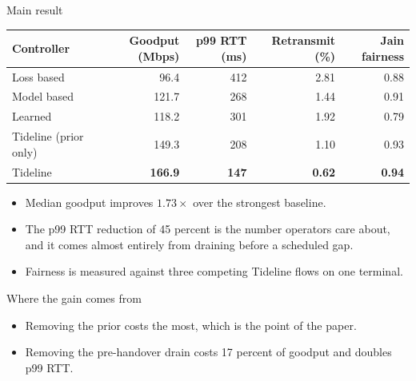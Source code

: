 \documentclass[aspectratio=169,10pt]{beamer}
\newcommand{\sysname}{Tideline}
\begin{document}
\begin{frame}{Main result}
  \begin{table}
    \centering
    \small
    \begin{tabular}{lrrrr}
      \toprule
      Controller & Goodput (Mbps) & p99 RTT (ms) & Retransmit (\%) & Jain fairness \\
      \midrule
      Loss based       & 96.4  & 412 & 2.81 & 0.88 \\
      Model based      & 121.7 & 268 & 1.44 & 0.91 \\
      Learned          & 118.2 & 301 & 1.92 & 0.79 \\
      \sysname{} (prior only)  & 149.3 & 208 & 1.10 & 0.93 \\
      \sysname{}       & \textbf{166.9} & \textbf{147} & \textbf{0.62} & \textbf{0.94} \\
      \bottomrule
    \end{tabular}
  \end{table}

  \vspace{0.4em}
  \begin{itemize}
    \item<2-> Median goodput improves $1.73\times$ over the strongest baseline.
    \item<3-> The p99 RTT reduction of 45 percent is the number operators care about, and it comes
      almost entirely from draining before a scheduled gap.
    \item<4-> Fairness is measured against three competing \sysname{} flows on one terminal.
  \end{itemize}
\end{frame}

\begin{frame}{Where the gain comes from}
  \centering

  \vspace{0.3em}
  \begin{itemize}
    \item<2-> Removing the prior costs the most, which is the point of the paper.
    \item<3-> Removing the pre-handover drain costs 17 percent of goodput and doubles p99 RTT.
  \end{itemize}
\end{frame}
\end{document}
